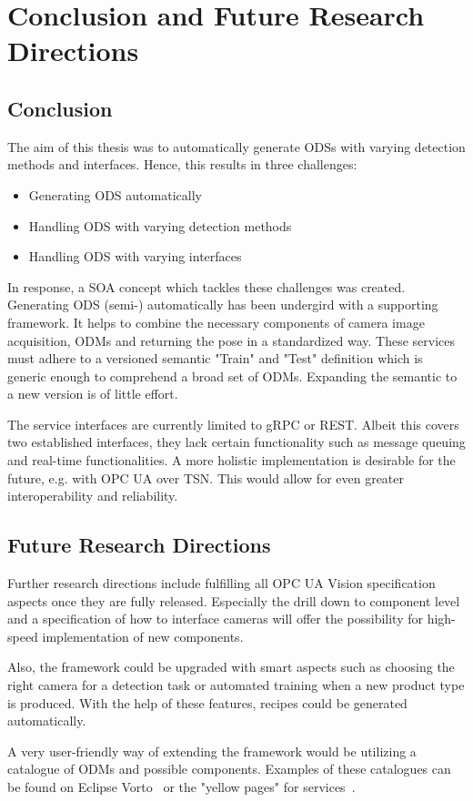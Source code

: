 \chapter{Conclusion and Future Research Directions\label{cha:chapter7}}
\section{Conclusion}
The aim of this thesis was to automatically generate ODSs with varying detection methods and interfaces. Hence, this results in three challenges:
\begin{itemize}
    \item Generating ODS automatically
    \item Handling ODS with varying detection methods
    \item Handling ODS with varying interfaces
\end{itemize}
In response, a SOA concept which tackles these challenges was created. Generating ODS (semi-) automatically has been undergird with a supporting framework. It helps to combine the necessary components of camera image acquisition, ODMs and returning the pose in a standardized way. These services must adhere to a versioned semantic "Train" and "Test" definition which is generic enough to comprehend a broad set of ODMs. Expanding the semantic to a new version is of little effort.

The service interfaces are currently limited to gRPC or REST. Albeit this covers two established interfaces, they lack certain functionality such as message queuing and real-time functionalities. A more holistic implementation is desirable for the future, e.g. with OPC UA over TSN. This would allow for even greater interoperability and reliability.

\section{Future Research Directions}
Further research directions include fulfilling all OPC UA Vision specification aspects once they are fully released. Especially the drill down to component level and a specification of how to interface cameras will offer the possibility for high-speed implementation of new components.

Also, the framework could be upgraded with smart aspects such as choosing the right camera for a detection task or automated training when a new product type is produced. With the help of these features, recipes could be generated automatically.

A very user-friendly way of extending the framework would be utilizing a catalogue of ODMs and possible components. Examples of these catalogues can be found on Eclipse Vorto~\cite{Eclipse2019Vorto2019} or the "yellow pages" for services~\cite{Kretschmer2014TeilnehmerverwaltungSteuerungsplattform}.